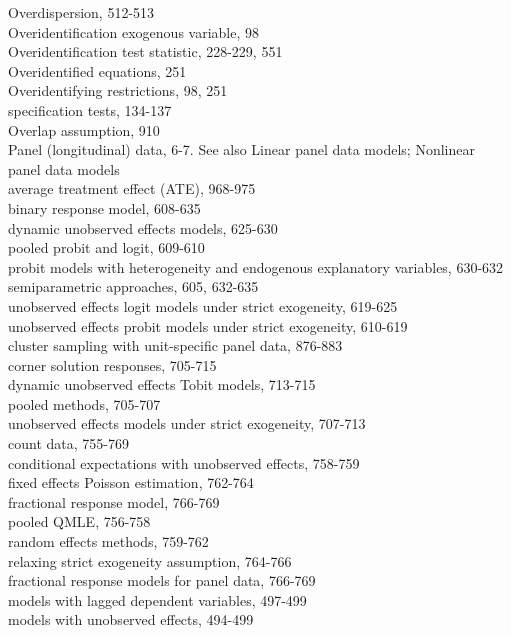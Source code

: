 \documentclass[10pt]{article}
\begin{document}
Overdispersion, 512-513\\
Overidentification exogenous variable, 98\\
Overidentification test statistic, 228-229, 551\\
Overidentified equations, 251\\
Overidentifying restrictions, 98, 251\\
specification tests, 134-137\\
Overlap assumption, 910\\
Panel (longitudinal) data, 6-7. See also Linear panel data models; Nonlinear panel data models\\
average treatment effect (ATE), 968-975\\
binary response model, 608-635\\
dynamic unobserved effects models, 625-630\\
pooled probit and logit, 609-610\\
probit models with heterogeneity and endogenous explanatory variables, 630-632\\
semiparametric approaches, 605, 632-635\\
unobserved effects logit models under strict exogeneity, 619-625\\
unobserved effects probit models under strict exogeneity, 610-619\\
cluster sampling with unit-specific panel data, 876-883\\
corner solution responses, 705-715\\
dynamic unobserved effects Tobit models, 713-715\\
pooled methods, 705-707\\
unobserved effects models under strict exogeneity, 707-713\\
count data, 755-769\\
conditional expectations with unobserved effects, 758-759\\
fixed effects Poisson estimation, 762-764\\
fractional response model, 766-769\\
pooled QMLE, 756-758\\
random effects methods, 759-762\\
relaxing strict exogeneity assumption, 764-766\\
fractional response models for panel data, 766-769\\
models with lagged dependent variables, 497-499\\
models with unobserved effects, 494-499\\
\end{document}
